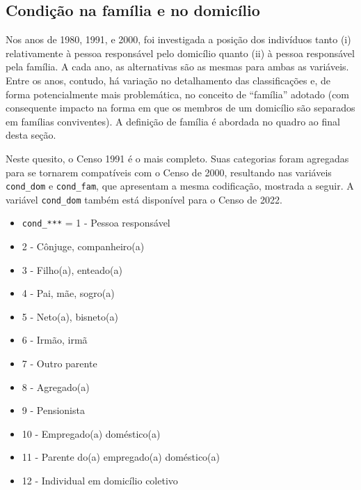 \documentclass[12pt,a4paper]{article}
\newcommand{\vr}[1]{\texttt{#1}}
\begin{document}
\subsection{Condição na família e no domicílio}\label{sec:d2}
Nos anos de 1980, 1991, e 2000, foi investigada a posição dos indivíduos tanto (i) relativamente à pessoa responsável pelo domicílio quanto (ii) à pessoa responsável pela família. A cada ano, as alternativas são as mesmas para ambas as variáveis. Entre os anos, contudo, há variação no detalhamento das classificações e, de forma potencialmente mais problemática, no conceito de “família” adotado (com consequente impacto na forma em que os membros de um domicílio são separados em famílias conviventes). A definição de família é abordada no quadro ao final desta seção.

Neste quesito, o Censo 1991 é o mais completo. Suas categorias foram agregadas para se tornarem compatíveis com o Censo de 2000, resultando nas variáveis \vr{cond\_dom} e \vr{cond\_fam}, que apresentam a mesma codificação, mostrada a seguir. A variável \vr{cond\_dom} também está disponível para o Censo de 2022.
\begin{itemize}
  \item \vr{cond\_***} = 1 - Pessoa responsável
  \item 2 - Cônjuge, companheiro(a)
  \item 3 - Filho(a), enteado(a)
  \item 4 - Pai, mãe, sogro(a)
  \item 5 - Neto(a), bisneto(a)
  \item 6 - Irmão, irmã
  \item 7 - Outro parente
  \item 8 - Agregado(a)
  \item 9 - Pensionista
  \item 10 - Empregado(a) doméstico(a)
  \item 11 - Parente do(a) empregado(a) doméstico(a)
  \item 12 - Individual em domicílio coletivo
\end{itemize}
\end{document}
